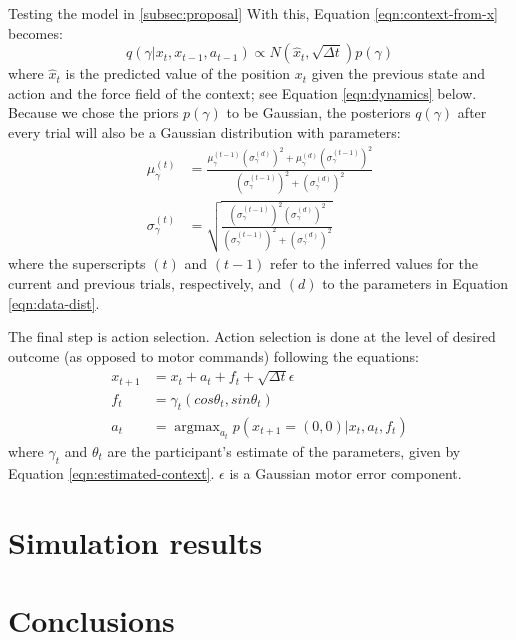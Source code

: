 \documentclass{report}
\DeclareMathOperator*{\argmax}{argmax}
\def \eref #1{Equation \ref{#1}}   %
\begin{document}
\begin{chapter}{Testing the model in \ref{subsec:proposal}}
With this, \eref{eqn:context-from-x} becomes:
\begin{equation}
q(\gamma | x_t, x_{t-1}, a_{t-1}) \propto N(\hat x_t, \sqrt{\Delta t})p(\gamma) \label{eqn:data-dist}
\end{equation}
where $\hat x_t$ is the predicted value of the position $x_t$ given the previous state and action and the force field of the context; see \eref{eqn:dynamics} below. Because we chose the priors $p(\gamma)$ to be Gaussian, the posteriors $q(\gamma)$ after every trial will also be a Gaussian distribution with parameters:
\begin{align}
  \mu_\gamma^{(t)} &= \frac{\mu_\gamma^{(t-1)}\left(\sigma_\gamma^{(d)}\right)^2 + \mu_\gamma^{(d)}\left(\sigma_\gamma^{(t-1)}\right)^2}{\left(\sigma_\gamma^{(t-1)}\right)^2 + \left(\sigma_\gamma^{(d)}\right)^2} \\
  \sigma_\gamma^{(t)} & = \sqrt{\frac{\left(\sigma_\gamma^{(t-1)}\right)^2\left(\sigma_\gamma^{(d)}\right)^2}{\left(\sigma_\gamma^{(t-1)}\right)^2 + \left(\sigma_\gamma^{(d)}\right)^2}}
\end{align}
where the superscripts $(t)$ and $(t-1)$ refer to the inferred values for the current and previous trials, respectively, and $(d)$ to the parameters in \eref{eqn:data-dist}.

The final step is action selection. Action selection is done at the level of desired outcome (as opposed to motor commands) following the equations:
\begin{align}
  x_{t+1} &= x_t + a_t + f_t + \sqrt{\Delta t}\epsilon\\ \label{eqn:dynamics}
  f_t &= \gamma_t (cos\theta_t, sin\theta_t) \\
  a_t &= \argmax_{a_t}p(x_{t+1} = (0, 0) | x_t, a_t, f_t)
\end{align}
where $\gamma_t$ and $\theta_t$ are the participant's estimate of the parameters, given by \eref{eqn:estimated-context}. $\epsilon$ is a Gaussian motor error component.

\section{Simulation results}

\section{Conclusions}



\end{chapter}







\end{document}
